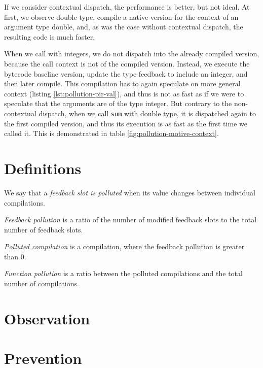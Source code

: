 If we consider contextual dispatch, the performance is better, but not ideal. At first, we observe double type, compile a native version for the context of an argument type double, and, as was the case without contextual dispatch, the resulting code is much faster.

When we call with integers, we do not dispatch into the already compiled version, because the call context is not  of the compiled version. Instead, we execute the bytecode baseline version, update the type feedback to include an integer, and then later compile. This compilation has to again speculate on more general context (listing \ref{lst:pollution-pir-val}), and thus is not as fast as if we were to speculate that the arguments are of the type integer. But contrary to the non-contextual dispatch, when we call \texttt{sum} with double type, it is dispatched again to the first compiled version, and thus its execution is as fast as the first time we called it. This is demonstrated in table \ref{fig:pollution-motive-context}.

\section{Definitions}

We say that a \textit{feedback slot is polluted} when its value changes between individual compilations.

\textit{Feedback pollution} is a ratio of the number of modified feedback slots to the total number of feedback slots.

\textit{Polluted compilation} is a compilation, where the feedback pollution is greater than 0.

\textit{Function pollution} is a ratio between the polluted compilations and the total number of compilations.

\section{Observation}


\section{Prevention}


